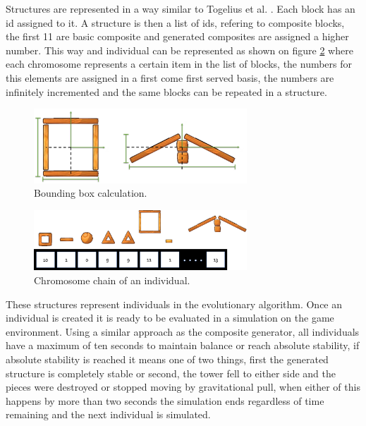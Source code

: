 \documentclass[conference]{IEEEtran}
\begin{document}
    Structures are represented in a way similar to Togelius et al.
    \cite{togelius2016Representationsforsearch-basedmethods}. Each block has
    an id assigned to it. A structure is then a list of ids, refering to
    composite blocks, the first 11 are basic composite and generated composites 
    are assigned a higher number.  This way and individual can be
    represented as shown on figure \ref{old_chrom} where each chromosome
    represents a certain item in the list of blocks, the numbers for this
    elements are assigned in a first come first served basis, the numbers are
    infinitely incremented and the same blocks can be repeated in a structure.
    
    \begin{figure}[htbp]
    \centerline{\includegraphics[width=80mm]{Images/bounding_box_calculation.png}}
    \caption{Bounding box calculation.}
    \label{bounding_boc_calc}
    \end{figure}
    
    \begin{figure}[htbp]
    \centerline{\includegraphics[width=80mm]{Images/chromosome_chain_example.png}}
    \caption{Chromosome chain of an individual.}
    \label{old_chrom}
    \end{figure}
    
    These structures represent individuals in the evolutionary algorithm. Once
    an individual is created it is ready to be evaluated in a simulation on the
    game environment. Using a similar approach as the composite generator, all
    individuals have a maximum of ten seconds to maintain balance or reach
    absolute stability, if absolute stability is reached it means one of two
    things, first the generated structure is completely stable or second, the
    tower fell to either side and the pieces were destroyed or stopped moving by
    gravitational pull, when either of this happens by more than two seconds the
    simulation ends regardless of time remaining and the next individual is
    simulated.
\end{document}
